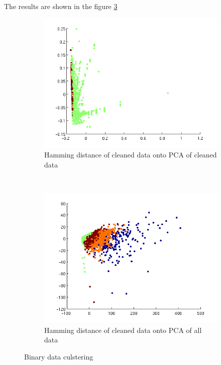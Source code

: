 \documentclass[a4paper,10pt]{article}
\begin{document}
The results are shown in the figure \ref{fig:binary}
\begin{figure}[h!]
        \centering
        \begin{subfigure}[b]{0.4\textwidth}
                \includegraphics[width=\textwidth]{Images/hamming.png}
                \caption{Hamming distance of cleaned data onto PCA of cleaned data}
    			\label{fig:binary1}
        \end{subfigure}
        ~
		\begin{subfigure}[b]{0.4\textwidth}
                \includegraphics[width=\textwidth]{Images/HammingDistanceOriginal.png}
                \caption{Hamming distance of cleaned data onto PCA of all data}
    			\label{fig:binary2}
        \end{subfigure}     
        \caption{Binary data culstering}  
        \label{fig:binary}
\end{figure}
\end{document}
